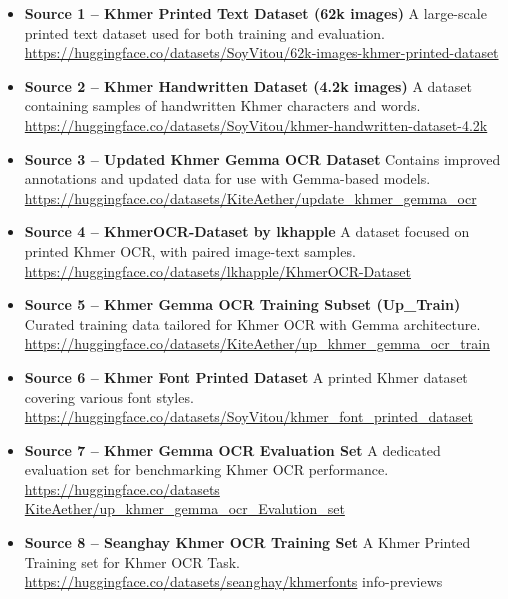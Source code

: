 \begin{itemize}
    \item \textbf{Source 1 – Khmer Printed Text Dataset (62k images)}  
    A large-scale printed text dataset used for both training and evaluation.  
    \url{https://huggingface.co/datasets/SoyVitou/62k-images-khmer-printed-dataset}

    \item \textbf{Source 2 – Khmer Handwritten Dataset (4.2k images)}  
    A dataset containing samples of handwritten Khmer characters and words.  
    \url{https://huggingface.co/datasets/SoyVitou/khmer-handwritten-dataset-4.2k}

    \item \textbf{Source 3 – Updated Khmer Gemma OCR Dataset}  
    Contains improved annotations and updated data for use with Gemma-based models.  
    \url{https://huggingface.co/datasets/KiteAether/update_khmer_gemma_ocr}

    \item \textbf{Source 4 – KhmerOCR-Dataset by lkhapple}  
    A dataset focused on printed Khmer OCR, with paired image-text samples.  
    \url{https://huggingface.co/datasets/lkhapple/KhmerOCR-Dataset}

    \item \textbf{Source 5 – Khmer Gemma OCR Training Subset (Up\_Train)}  
    Curated training data tailored for Khmer OCR with Gemma architecture.  
    \url{https://huggingface.co/datasets/KiteAether/up_khmer_gemma_ocr_train}

    \item \textbf{Source 6 – Khmer Font Printed Dataset}  
    A printed Khmer dataset covering various font styles.  
    \url{https://huggingface.co/datasets/SoyVitou/khmer_font_printed_dataset}

    \item \textbf{Source 7 – Khmer Gemma OCR Evaluation Set}  
    A dedicated evaluation set for benchmarking Khmer OCR performance.  
    \url{https://huggingface.co/datasets 
    KiteAether/up_khmer_gemma_ocr_Evalution_set}

    \item \textbf{Source 8 – Seanghay Khmer OCR Training Set}  
    A Khmer Printed Training set for Khmer OCR Task.  
    \url{https://huggingface.co/datasets/seanghay/khmerfonts}
    info-previews

\end{itemize}

\vspace{0.5cm}

